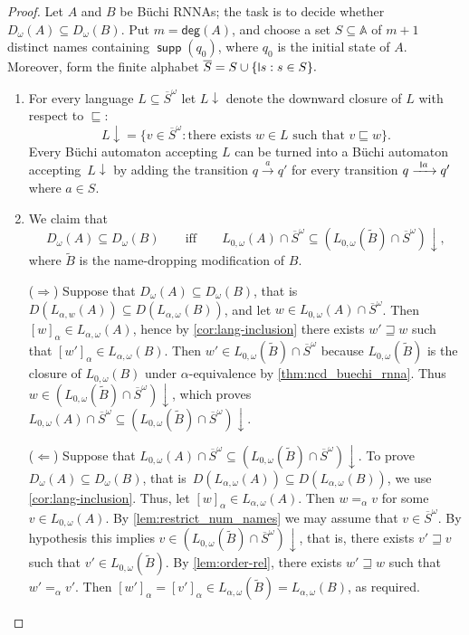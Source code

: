 \documentclass[final,a4paper,UKenglish,thm-restate,autoref,numberwithinsect]{lipics-v2021}
\newcommand{\midmid}{\hspace{0.2ex}{\rule[-0.1ex]{0.6pt}{1.65ex}}\hspace{0.2ex}}
\newcommand{\scriptmidmid}{\hspace{0.2ex}{\rule[-0.1ex]{0.6pt}{1.1ex}}\hspace{0.2ex}}
\newcommand{\compr}{:}
\newcommand{\newletter}[1]{{\midmid}#1}
\newcommand{\scriptnew}[1]{{\scriptmidmid}#1}
\newcommand{\degree}{\mathsf{deg}}
\numberwithin{equation}{section}
\newcommand{\ol}{\overline}
\newcommand{\xto}[1]{\xrightarrow{~#1~}}
\newcommand{\seq}{\subseteq}
\newcommand{\tl}{\widetilde}
\newcommand{\+}[1]{\mathcal{#1}\xspace}
\newcommand{\names}{\mathbb{A}}
\DeclareMathOperator{\supp}{\mathsf{supp}} %
\theoremstyle{definition}
\begin{document}
\begin{proof}
  Let $A$ and $B$ be Büchi RNNAs; the task is to decide whether
  $D_\omega(A)\seq D_\omega(B)$. Put $m=\degree(A)$, and choose a set $S\seq \names$ of $m+1$
  distinct names containing $\supp(q_{0})$, where $q_0$ is the initial state of $A$. Moreover, form the finite
  alphabet
$
    \ol{S}=S\cup \{\newletter s\compr s\in S\}.
$
  \begin{enumerate}
  \item For every language $L\seq \ol{S}^\omega$ let $L{\downarrow}$
    denote the downward closure of $L$ with respect to $\sqsubseteq$:
    \[
      L{\downarrow} = \{ v\in \ol{S}^\omega\compr \text{there exists $w\in
        L$ such that } v\sqsubseteq w \}.
    \]
    Every Büchi automaton accepting $L$ can be turned into a Büchi
    automaton accepting~$L{\downarrow}$ by adding the transition
    $q\xto{a}q'$ for every transition $q\xto{\scriptnew a} q'$ where
    $a\in S$.
    
  \item We claim that
    \begin{equation}\label{eq:acc_equiv_local}
      D_\omega(A)\seq D_\omega(B)
      \qquad\text{iff}\qquad
      L_{0,\omega}(A)\cap \ol{S}^\omega \seq (L_{0,\omega}(\tl{B})\cap
      \ol{S}^\omega){\downarrow},
    \end{equation}
    where $\tl{B}$ is the name-dropping modification of $B$.

    \smallskip\noindent ($\Rightarrow$) Suppose that
    $D_\omega(A)\seq D_\omega(B)$, that is
    $D(L_{\alpha,w}(A))\seq D(L_{\alpha,\omega}(B))$, and let
    $w\in L_{0,\omega}(A)\cap \ol{S}^\omega$. Then
    $[w]_\alpha\in L_{\alpha,\omega}(A)$, hence by
    \autoref{cor:lang-inclusion} there exists $w'\sqsupseteq w$ such
    that $[w']_\alpha\in L_{\alpha,\omega}(B)$. Then
    $w'\in L_{0,\omega}(\tl{B})\cap \ol{S}^\omega$ because
    $L_{0,\omega}(\tl{B})$ is the closure of $L_{0,\omega}(B)$ under
    $\alpha$-equivalence by \autoref{thm:ncd_buechi_rnna}. Thus
    $w\in (L_{0,\omega}(\tl{B})\cap \ol{S}^\omega){\downarrow}$, which
    proves
    $ L_{0,\omega}(A)\cap \ol{S}^\omega \seq (L_{0,\omega}(\tl{B})\cap
    \ol{S}^\omega){\downarrow}$.

    \smallskip\noindent ($\Leftarrow$) Suppose that
    $L_{0,\omega}(A)\cap \ol{S}^\omega \seq (L_{0,\omega}(\tl{B})\cap
    \ol{S}^\omega){\downarrow}$. To prove
    $D_\omega(A)\seq D_\omega(B)$, that
    is~$D(L_{\alpha,\omega}(A))\seq D(L_{\alpha,\omega}(B))$, we use
    \autoref{cor:lang-inclusion}. Thus, let
    $[w]_\alpha \in L_{\alpha,\omega}(A)$. Then $w=_\alpha v$ for some
    $v\in L_{0,\omega}(A)$. By \autoref{lem:restrict_num_names} we may
    assume that $v\in \ol{S}^\omega$.  By hypothesis this implies
    $v\in (L_{0,\omega}(\tl{B})\cap \ol{S}^\omega){\downarrow}$, that
    is, there exists $v'\sqsupseteq v$ such that
    $v'\in L_{0,\omega}(\tl{B})$. By \autoref{lem:order-rel}, there
    exists $w'\sqsupseteq w$ such that $w'=_\alpha v'$. Then
    $[w']_\alpha = [v']_\alpha \in L_{\alpha,\omega}(\tl{B}) = 
    L_{\alpha,\omega}(B)$, as required.


\end{enumerate}
\end{proof}
\end{document}
